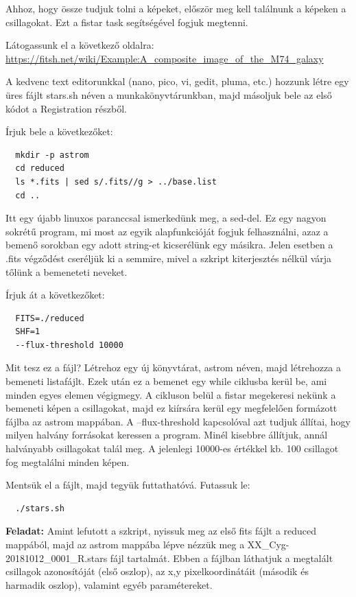 \documentclass{article}
\begin{document}
Ahhoz, hogy össze tudjuk tolni a képeket, először meg kell találnunk a képeken a
csillagokat. Ezt a fistar task segítségével fogjuk megtenni.

Látogassunk el a következő oldalra:
\url{https://fitsh.net/wiki/Example:A_composite_image_of_the_M74_galaxy}

A kedvenc text editorunkkal (nano, pico, vi, gedit, pluma, etc.) hozzunk létre
egy üres fájlt stars.sh néven a munkakönyvtárunkban, majd másoljuk bele az első
kódot a Registration részből.

Írjuk bele a következőket:
\begin{verbatim}
  mkdir -p astrom
  cd reduced
  ls *.fits | sed s/.fits//g > ../base.list
  cd ..
\end{verbatim}

Itt egy újabb linuxos paranccsal ismerkedünk meg, a sed-del. Ez egy nagyon
sokrétű program, mi most az egyik alapfunkcióját fogjuk felhasználni, azaz a
bemenő sorokban egy adott string-et kicserélünk egy másikra. Jelen esetben a
.fits végződést cseréljük ki a semmire, mivel a szkript kiterjesztés nélkül
várja tőlünk a bemeneteti neveket.

Írjuk át a következőket:
\begin{verbatim}
  FITS=./reduced
  SHF=1
  --flux-threshold 10000
\end{verbatim}

Mit tesz ez a fájl? Létrehoz egy új könyvtárat, astrom néven, majd létrehozza a
bemeneti listafájlt. Ezek után ez a bemenet egy while ciklusba kerül be, ami
minden egyes elemen végigmegy. A cikluson belül a fistar megekeresi nekünk a
bemeneti képen a csillagokat, majd ez kiírsára kerül egy megfelelően formázott
fájlba az astrom mappában.
A --flux-threshold kapcsolóval azt tudjuk állítai, hogy milyen halvány
forrásokat keressen a program. Minél kisebbre  állítjuk, annál halványabb
csillagokat talál meg. A jelenlegi 10000-es értékkel kb. 100 csillagot fog
megtalálni minden képen.

Mentsük el a fájlt, majd tegyük futtathatóvá. Futassuk le:

\begin{verbatim}
  ./stars.sh
\end{verbatim}

{\bf Feladat:}
Amint lefutott a szkript, nyissuk meg az első fits fájlt a reduced mappából,
majd az astrom mappába lépve nézzük meg a XX\_Cyg-20181012\_0001\_R.stars fájl
tartalmát. Ebben a fájlban láthatjuk a megtalált csillagok azonosítóját (első
oszlop), az x,y pixelkoordinátáit (második és harmadik oszlop), valamint
egyéb paramétereket.
\end{document}
